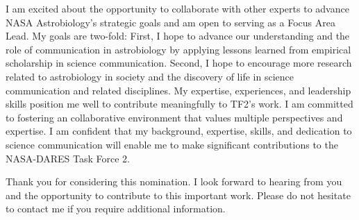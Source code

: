 \documentclass[12pt]{article}
\begin{document}
\vspace{1em}

I am excited about the opportunity to collaborate with other experts to advance NASA Astrobiology's strategic goals and am open to serving as a Focus Area Lead. My goals are two-fold: First, I hope to advance our understanding and the role of communication in astrobiology by applying lessons learned from empirical scholarship in science communication. Second, I hope to encourage more research related to astrobiology in society and the discovery of life in science communication and related disciplines. My expertise, experiences, and leadership skills position me well to contribute meaningfully to TF2’s work. I am committed to fostering an collaborative environment that values multiple perspectives and expertise. I am confident that my background, expertise, skills, and dedication to science communication will enable me to make significant contributions to the NASA-DARES Task Force 2.

\vspace{1em}

Thank you for considering this nomination. I look forward to hearing from you and the opportunity to contribute to this important work. Please do not hesitate to contact me if you require additional information.

\newpage

\printbibliography
\end{document}
